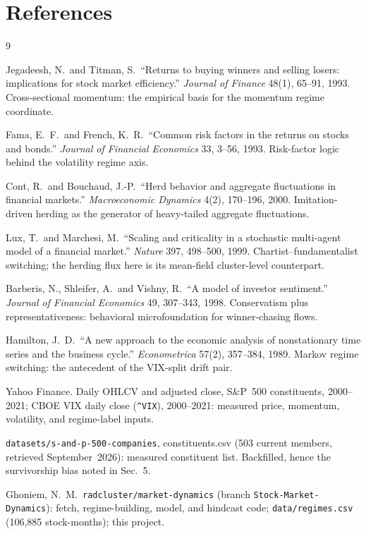 \documentclass[11pt,a4paper]{article}
\begin{document}
\section{References}
\vspace{-1.4em}
\renewcommand{\refname}{}
{\small
\begin{thebibliography}{9}

Jegadeesh, N.\ and Titman, S.\ ``Returns to buying winners and selling
losers: implications for stock market efficiency.'' \textit{Journal of
Finance} 48(1), 65--91, 1993.  Cross-sectional momentum: the empirical basis
for the momentum regime coordinate.

Fama, E.~F.\ and French, K.~R.\ ``Common risk factors in the returns on
stocks and bonds.'' \textit{Journal of Financial Economics} 33, 3--56, 1993.
Risk-factor logic behind the volatility regime axis.

Cont, R.\ and Bouchaud, J.-P.\ ``Herd behavior and aggregate fluctuations in
financial markets.'' \textit{Macroeconomic Dynamics} 4(2), 170--196, 2000.
Imitation-driven herding as the generator of heavy-tailed aggregate
fluctuations.

Lux, T.\ and Marchesi, M.\ ``Scaling and criticality in a stochastic
multi-agent model of a financial market.'' \textit{Nature} 397, 498--500,
1999.  Chartist--fundamentalist switching; the herding flux here is its
mean-field cluster-level counterpart.

Barberis, N., Shleifer, A.\ and Vishny, R.\ ``A model of investor
sentiment.'' \textit{Journal of Financial Economics} 49, 307--343, 1998.
Conservatism plus representativeness: behavioral microfoundation for
winner-chasing flows.

Hamilton, J.~D.\ ``A new approach to the economic analysis of nonstationary
time series and the business cycle.'' \textit{Econometrica} 57(2), 357--384,
1989.  Markov regime switching: the antecedent of the VIX-split drift pair.

Yahoo Finance.  Daily OHLCV and adjusted close, S\&P~500 constituents,
2000--2021; CBOE VIX daily close (\texttt{\^{}VIX}), 2000--2021: measured
price, momentum, volatility, and regime-label inputs.

\texttt{datasets/s-and-p-500-companies}, constituents.csv (503 current
members, retrieved September~2026): measured constituent list.  Backfilled,
hence the survivorship bias noted in Sec.~5.

Ghoniem, N.~M.\ \texttt{radcluster/market-dynamics} (branch
\texttt{Stock-Market-Dynamics}): fetch, regime-building, model, and
hindcast code; \texttt{data/regimes.csv} (106{,}885 stock-months); this
project.

\end{thebibliography}
}
\end{document}
